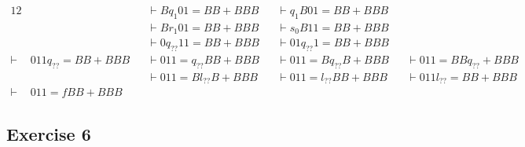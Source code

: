 {\begin{alignat*}{12}
		   &                    &&\vdash B q_{1 } 01=BB+BBB &&\vdash q_{1 } B01=BB+BBB  &&\\
		   &                    &&\vdash B r_{1 } 01=BB+BBB &&\vdash s_0 B11=BB+BBB     &&\\
		   &                    &&\vdash 0 q_{??} 11=BB+BBB &&\vdash 01 q_{??} 1=BB+BBB &&\\
	\vdash & 011 q_{??} =BB+BBB &&\vdash 011= q_{??} BB+BBB &&\vdash 011=B q_{??} B+BBB &&\vdash 011=BB q_{??} +BBB &&\\
		   &                    &&\vdash 011=B l_{??} B+BBB &&\vdash 011= l_{??} BB+BBB &&\vdash 011 l_{??} =BB+BBB &&\\
	\vdash & 011= f BB+BBB      && 
\end{alignat*}
\subsection{Exercise 6}
}
